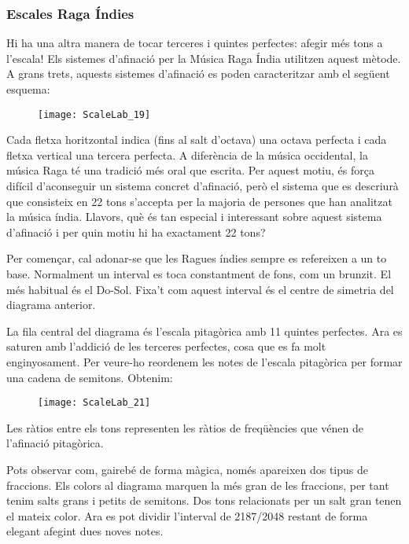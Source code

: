 \subsubsection{Escales Raga Índies}
Hi ha una altra manera de tocar terceres i quintes perfectes: afegir més tons a l'escala! Els sistemes d'afinació per la Música Raga Índia utilitzen aquest mètode. A grans trets, aquests sistemes d'afinació es poden caracteritzar amb el següent esquema:

\begin{figure}[h]
\centering
\texttt{[image: ScaleLab\_19]}
\end{figure}

Cada fletxa horitzontal indica (fins al salt d'octava) una octava perfecta i cada fletxa vertical una tercera perfecta. A diferència de la música occidental, la música Raga té una tradició més oral que escrita. Per aquest motiu, és força difícil d'aconseguir un sistema concret d'afinació, però el sistema que es descriurà que consisteix en 22 tons s'accepta per la majoria de persones que han analitzat la música índia. Llavors, què és tan especial i interessant sobre aquest sistema d'afinació i per quin motiu hi ha exactament 22 tons?

Per començar, cal adonar-se que les Ragues índies sempre es refereixen a un to base. Normalment un interval es toca constantment de fons, com un brunzit. El més habitual és el Do-Sol. Fixa't com aquest interval és el centre de simetria del diagrama anterior.

La fila central del diagrama és l'escala pitagòrica amb 11 quintes perfectes. Ara es saturen amb l'addició de les terceres perfectes, cosa que es fa molt enginyosament. Per veure-ho reordenem les notes de l'escala pitagòrica per formar una cadena de semitons. Obtenim:

\begin{figure}[h]
\centering
\texttt{[image: ScaleLab\_21]}
\end{figure}

Les ràtios entre els tons representen les ràtios de freqüències que vénen de l'afinació pitagòrica.

Pots observar com, gairebé de forma màgica, només apareixen dos tipus de fraccions. Els colors al diagrama marquen la més gran de les fraccions, per tant tenim salts grans i petits de semitons. Dos tons relacionats per un salt gran tenen el mateix color. Ara es pot dividir l'interval de 2187/2048 restant de forma elegant afegint dues noves notes.

